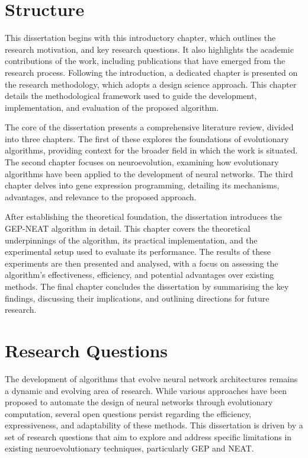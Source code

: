 \section{Structure}
This dissertation begins with this introductory chapter, which outlines the research motivation, and key research questions. It also highlights the academic contributions of the work, including publications that have emerged from the research process. Following the introduction, a dedicated chapter is presented on the research methodology, which adopts a design science approach. This chapter details the methodological framework used to guide the development, implementation, and evaluation of the proposed algorithm.

\parbreak\noindent The core of the dissertation presents a comprehensive literature review, divided into three chapters. The first of these explores the foundations of evolutionary algorithms, providing context for the broader field in which the work is situated. The second chapter focuses on neuroevolution, examining how evolutionary algorithms have been applied to the development of neural networks. The third chapter delves into gene expression programming, detailing its mechanisms, advantages, and relevance to the proposed approach.

\parbreak\noindent After establishing the theoretical foundation, the dissertation introduces the GEP-NEAT algorithm in detail. This chapter covers the theoretical underpinnings of the algorithm, its practical implementation, and the experimental setup used to evaluate its performance. The results of these experiments are then presented and analysed, with a focus on assessing the algorithm's effectiveness, efficiency, and potential advantages over existing methods. The final chapter concludes the dissertation by summarising the key findings, discussing their implications, and outlining directions for future research.

\section{Research Questions}
The development of algorithms that evolve neural network architectures remains a dynamic and evolving area of research. While various approaches have been proposed to automate the design of neural networks through evolutionary computation, several open questions persist regarding the efficiency, expressiveness, and adaptability of these methods. This dissertation is driven by a set of research questions that aim to explore and address specific limitations in existing neuroevolutionary techniques, particularly GEP and NEAT.

